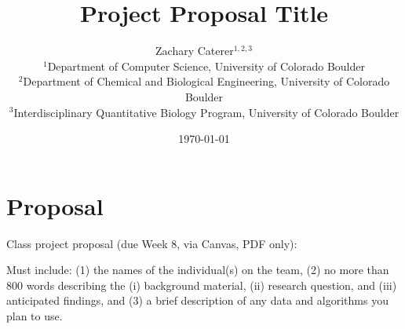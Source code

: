 \documentclass[10pt,twocolumn]{article}
\title{\textbf{Project Proposal Title}}
\author{
    Zachary Caterer$^{1,2,3}$ \\
    \small $^1$Department of Computer Science, University of Colorado Boulder \\
    \small $^2$Department of Chemical and Biological Engineering, University of Colorado Boulder \\
    \small $^3$Interdisciplinary Quantitative Biology Program, University of Colorado Boulder
}
\date{\today}
\begin{document}
\maketitle

\section*{Proposal}

Class project proposal (due Week 8, via Canvas, PDF only): 

Must include: (1) the names of the individual(s) on the team, (2) no more than 800 words describing the (i) background material, (ii) research question, and (iii) anticipated findings, and (3) a brief description of any data and algorithms you plan to use.
\end{document}
